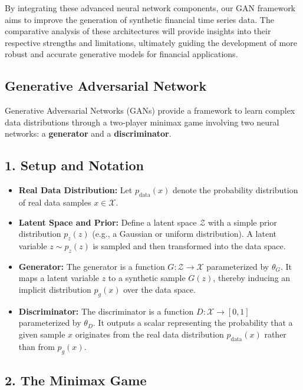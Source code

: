 \documentclass{article}
\begin{document}
By integrating these advanced neural network components, our GAN framework aims to improve the generation of synthetic financial time series data. The comparative analysis of these architectures will provide insights into their respective strengths and limitations, ultimately guiding the development of more robust and accurate generative models for financial applications.

\subsection{Generative Adversarial Network}

Generative Adversarial Networks (GANs) provide a framework to learn complex data distributions through a two-player minimax game involving two neural networks: a \textbf{generator} and a \textbf{discriminator}.

\subsection*{1. Setup and Notation}

\begin{itemize}
    \item \textbf{Real Data Distribution:}
    Let $ p_{\text{data}}(x) $ denote the probability distribution of real data samples $ x \in \mathcal{X} $.

    \item \textbf{Latent Space and Prior:}
    Define a latent space $ \mathcal{Z} $ with a simple prior distribution $ p_z(z) $ (e.g., a Gaussian or uniform distribution). A latent variable $ z \sim p_z(z) $ is sampled and then transformed into the data space.

    \item \textbf{Generator:}
    The generator is a function $ G: \mathcal{Z} \to \mathcal{X} $ parameterized by $ \theta_G $. It maps a latent variable $ z $ to a synthetic sample $ G(z) $, thereby inducing an implicit distribution $ p_g(x) $ over the data space.

    \item \textbf{Discriminator:}
    The discriminator is a function $ D: \mathcal{X} \to [0,1] $ parameterized by $ \theta_D $. It outputs a scalar representing the probability that a given sample $ x $ originates from the real data distribution $ p_{\text{data}}(x) $ rather than from $ p_g(x) $.
\end{itemize}

\subsection*{2. The Minimax Game}
\end{document}
